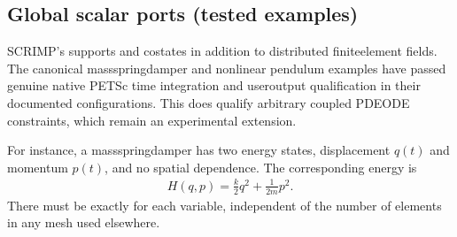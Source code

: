\documentclass[letterpaper,10pt,english]{sphinxmanual}
\begin{document}
\subsection{Global scalar ports (tested examples)}
\label{\detokenize{lumped:global-scalar-ports-tested-examples}}\label{\detokenize{lumped:lumped}}
\sphinxAtStartPar
SCRIMP’s {\hyperref[\detokenize{scrimp:scrimp.dphs.DPHS}]{}} supports  and co\sphinxhyphen{}states in addition to distributed finite\sphinxhyphen{}element fields.
The canonical mass\textendash{}spring\textendash{}damper and nonlinear pendulum examples
have passed genuine native PETSc time integration and user\sphinxhyphen{}output
qualification in their documented configurations. This does
 qualify arbitrary coupled PDE\textendash{}ODE constraints, which
remain an experimental extension.

\sphinxAtStartPar
For instance, a mass\textendash{}spring\textendash{}damper has two energy states, displacement
\(q(t)\) and momentum \(p(t)\), and no spatial dependence.
The corresponding energy is
\begin{equation*}
\begin{split}H(q,p) = \tfrac{k}{2} q^2 + \tfrac{1}{2m} p^2.\end{split}
\end{equation*}
\sphinxAtStartPar
There must be exactly  for each variable,
independent of the number of elements in any mesh used elsewhere.
\end{document}
